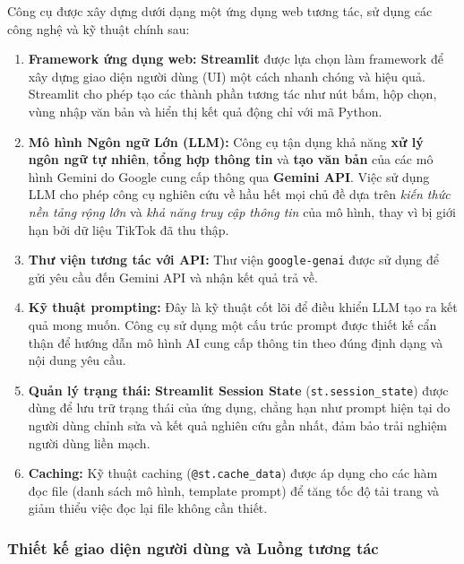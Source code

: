 \noindent
Công cụ được xây dựng dưới dạng một ứng dụng web tương tác, sử dụng các công nghệ và kỹ thuật chính sau:
\begin{enumerate}
    \item \textbf{Framework ứng dụng web:} \textbf{Streamlit} được lựa chọn làm framework để xây dựng giao diện người dùng (UI) một cách nhanh chóng và hiệu quả. Streamlit cho phép tạo các thành phần tương tác như nút bấm, hộp chọn, vùng nhập văn bản và hiển thị kết quả động chỉ với mã Python.
    
    \item \textbf{Mô hình Ngôn ngữ Lớn (LLM):} Công cụ tận dụng khả năng \textbf{xử lý ngôn ngữ tự nhiên}, \textbf{tổng hợp thông tin} và \textbf{tạo văn bản} của các mô hình Gemini do Google cung cấp thông qua \textbf{Gemini API}. Việc sử dụng LLM cho phép công cụ nghiên cứu về hầu hết mọi chủ đề dựa trên \textit{kiến thức nền tảng rộng lớn} và \textit{khả năng truy cập thông tin} của mô hình, thay vì bị giới hạn bởi dữ liệu TikTok đã thu thập.
    
    \item \textbf{Thư viện tương tác với API:} Thư viện \texttt{google-genai} được sử dụng để gửi yêu cầu đến Gemini API và nhận kết quả trả về.
    
    \item \textbf{Kỹ thuật prompting:} Đây là kỹ thuật cốt lõi để điều khiển LLM tạo ra kết quả mong muốn. Công cụ sử dụng một cấu trúc prompt được thiết kế cẩn thận để hướng dẫn mô hình AI cung cấp thông tin theo đúng định dạng và nội dung yêu cầu.
    
    \item \textbf{Quản lý trạng thái:} \textbf{Streamlit Session State} (\texttt{st.session\_state}) được dùng để lưu trữ trạng thái của ứng dụng, chẳng hạn như prompt hiện tại do người dùng chỉnh sửa và kết quả nghiên cứu gần nhất, đảm bảo trải nghiệm người dùng liền mạch.
    
    \item \textbf{Caching:} Kỹ thuật caching (\texttt{@st.cache\_data}) được áp dụng cho các hàm đọc file (danh sách mô hình, template prompt) để tăng tốc độ tải trang và giảm thiểu việc đọc lại file không cần thiết.
\end{enumerate}

\subsubsection{Thiết kế giao diện người dùng và Luồng tương tác}

